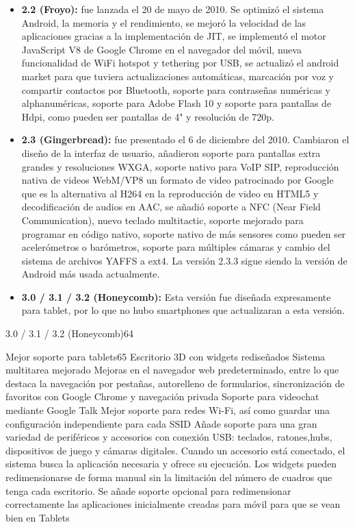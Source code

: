 \begin{itemize}
	\item \textbf{2.2 (Froyo):} fue lanzada el 20 de mayo de 2010. Se optimizó el sistema Android, la memoria y el rendimiento, se mejoró la velocidad de las aplicaciones gracias a la implementación de JIT, se implementó el motor JavaScript V8 de Google Chrome en el navegador del móvil, nueva funcionalidad de WiFi hotspot y tethering por USB, se actualizó el android market para que tuviera actualizaciones automáticas, marcación por voz y compartir contactos por Bluetooth, soporte para contraseñas numéricas y alphanuméricas, soporte para Adobe Flash 10 y soporte para pantallas de Hdpi, como pueden ser pantallas de 4" y resolución de 720p. 

	\item \textbf{2.3 (Gingerbread):} fue presentado el 6 de diciembre del 2010. Cambiaron el diseño de la interfaz de usuario, añadieron soporte para pantallas extra grandes y resoluciones WXGA, soporte nativo para VoIP SIP, reproducción nativa de videos WebM/VP8 un formato de video patrocinado por Google que es la alternativa al H264 en la reproducción de video en HTML5 y decodificación de audios en AAC, se añadió soporte a NFC (Near Field Communication), nuevo teclado multitactic, soporte mejorado para programar en código nativo, soporte nativo de más sensores como pueden ser acelerómetros o barómetros, soporte para múltiples cámaras y cambio del sistema de archivos YAFFS a ext4. La versión 2.3.3 sigue siendo la versión de Android más usada actualmente. 

	\item \textbf{3.0 / 3.1 / 3.2 (Honeycomb):} Esta versión fue diseñada expresamente para tablet, por lo que no hubo smartphones que actualizaran a esta versión.


\end{itemize}






3.0 / 3.1 / 3.2 (Honeycomb)64 	

    Mejor soporte para tablets65
    Escritorio 3D con widgets rediseñados
    Sistema multitarea mejorado
    Mejoras en el navegador web predeterminado, entre lo que destaca la navegación por pestañas, autorelleno de formularios, sincronización de favoritos con Google Chrome y navegación privada
    Soporte para videochat mediante Google Talk
    Mejor soporte para redes Wi-Fi, así como guardar una configuración independiente para cada SSID
    Añade soporte para una gran variedad de periféricos y accesorios con conexión USB: teclados, ratones,hubs, dispositivos de juego y cámaras digitales. Cuando un accesorio está conectado, el sistema busca la aplicación necesaria y ofrece su ejecución.
    Los widgets pueden redimensionarse de forma manual sin la limitación del número de cuadros que tenga cada escritorio.
    Se añade soporte opcional para redimensionar correctamente las aplicaciones inicialmente creadas para móvil para que se vean bien en Tablets

